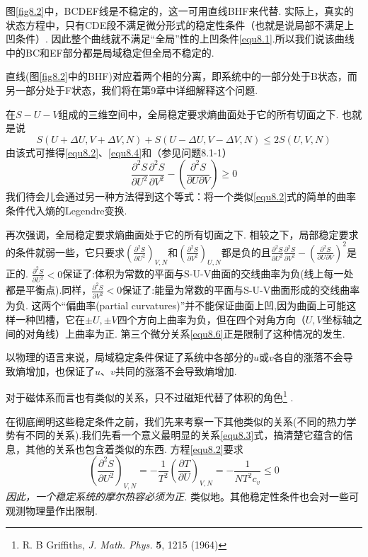 图\ref{fig8.2}中，BCDEF线是不稳定的，这一可用直线BHF来代替. 实际上，真实的状态方程中，只有CDE段不满足微分形式的稳定性条件（也就是说局部不满足上凹条件）. 因此整个曲线就不满足“全局”性的上凹条件\eqref{equ8.1}.所以我们说该曲线中的BC和EF部分都是局域稳定但全局不稳定的.

直线(图\ref{fig8.2}中的BHF)对应着两个相的分离，即系统中的一部分处于B状态，而另一部分处于F状态，我们将在第9章中详细解释这个问题.

在$S-U-V$组成的三维空间中，全局稳定要求熵曲面处于它的所有切面之下. 也就是说
\begin{equation}
\label{equ8.5}
S(U+\Delta　U,V+\Delta　V,N)+S(U-\Delta　U,V-\Delta V,N)\leq 2S(U,V,N)
\end{equation}
由该式可推得\eqref{equ8.2}、\eqref{equ8.4}和（参见问题8.1-1）
\begin{equation}
\label{equ8.6}
\frac{\partial^2S}{\partial U^2}\frac{\partial^2S}{\partial V^2}-\left(\frac{\partial^2S}{\partial U\partial V}\right) \ge 0
\end{equation}
我们待会儿会通过另一种方法得到这个等式：将一个类似\eqref{equ8.2}式的简单的曲率条件代入熵的Legendre变换.

再次强调，全局稳定要求熵曲面处于它的所有切面之下. 相较之下，局部稳定要求的条件就弱一些，它只要求$\left(\frac{\partial^2S}{\partial U^2}\right)_{V,N}$和$\left(\frac{\partial^2S}{\partial V^2}\right)_{U,N}$都是负的且$\frac{\partial^2S}{\partial U^2}\frac{\partial^2S}{\partial V^2}-\left(\frac{\partial^2S}{\partial U\partial V}\right)^2$是正的.
$\frac{\partial^2S}{\partial U^2}<0$保证了:体积为常数的平面与S-U-V曲面的交线曲率为负(线上每一处都是平衡点).同样，$\frac{\partial^2S}{\partial V^2}<0$保证了:能量为常数的平面与S-U-V曲面形成的交线曲率为负.
这两个“偏曲率(partial curvatures)”并不能保证曲面上凹,因为曲面上可能这样一种凹槽，它在$\pm U, \pm V$四个方向上曲率为负，但在四个对角方向（$U,V$坐标轴之间的对角线）上曲率为正. 第三个微分关系\eqref{equ8.6}正是限制了这种情况的发生.

以物理的语言来说，局域稳定条件保证了系统中各部分的$u$或$v$各自的涨落不会导致熵增加，也保证了$u$、$v$共同的涨落不会导致熵增加.

对于磁体系而言也有类似的关系，只不过磁矩代替了体积的角色\footnote{R. B Griffiths, {\it J. Math. Phys.} {\bf 5}, 1215 (1964)} .

在彻底阐明这些稳定条件之前，我们先来考察一下其他类似的关系(不同的热力学势有不同的关系).我们先看一个意义最明显的关系\eqref{equ8.3}式，搞清楚它蕴含的信息，其他的关系也包含着类似的东西. 方程\eqref{equ8.2}要求
\begin{equation}
\label{equ8.7}
\left(\frac{\partial^2S}{\partial U^2}\right)_{V,N}=-\frac{1}{T^2}\left(\frac{\partial T}{\partial U}\right)_{V,N}=-\frac{1}{NT^2c_v}\leq 0
\end{equation} 
{\it 因此，一个稳定系统的摩尔热容必须为正.} 类似地。其他稳定性条件也会对一些可观测物理量作出限制.

